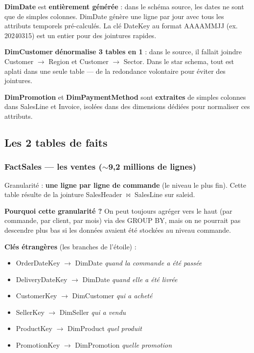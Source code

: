 \documentclass[11pt,a4paper]{article}
\renewcommand{\texttt}[1]{{\ttfamily\small\colorbox{codebg}{\textcolor{darktext}{#1}}}}
\begin{document}
\begin{infobox}
\textbf{DimDate} est \textbf{entièrement générée} : dans le schéma source, les dates ne sont que de simples colonnes. DimDate génère une ligne par jour avec tous les attributs temporels pré-calculés. La clé \texttt{DateKey} au format AAAAMMJJ (ex. 20240315) est un entier pour des jointures rapides.

\textbf{DimCustomer} \textbf{dénormalise 3 tables en 1} : dans le source, il fallait joindre Customer $\to$ Region et Customer $\to$ Sector. Dans le star schema, tout est aplati dans une seule table --- de la redondance volontaire pour éviter des jointures.

\textbf{DimPromotion} et \textbf{DimPaymentMethod} sont \textbf{extraites} de simples colonnes dans SalesLine et Invoice, isolées dans des dimensions dédiées pour normaliser ces attributs.
\end{infobox}

\subsection{Les 2 tables de faits}

\subsubsection{FactSales --- les ventes ($\sim$9,2 millions de lignes)}

Granularité : \textbf{une ligne par ligne de commande} (le niveau le plus fin). Cette table résulte de la jointure SalesHeader $\bowtie$ SalesLine sur \texttt{saleid}.

\textbf{Pourquoi cette granularité ?} On peut toujours agréger vers le haut (par commande, par client, par mois) via des \texttt{GROUP BY}, mais on ne pourrait pas descendre plus bas si les données avaient été stockées au niveau commande.

\textbf{Clés étrangères} (les branches de l'étoile) :
\begin{itemize}[noitemsep,leftmargin=1.2em]
  \item \texttt{OrderDateKey} $\to$ DimDate \hfill\textit{quand la commande a été passée}
  \item \texttt{DeliveryDateKey} $\to$ DimDate \hfill\textit{quand elle a été livrée}
  \item \texttt{CustomerKey} $\to$ DimCustomer \hfill\textit{qui a acheté}
  \item \texttt{SellerKey} $\to$ DimSeller \hfill\textit{qui a vendu}
  \item \texttt{ProductKey} $\to$ DimProduct \hfill\textit{quel produit}
  \item \texttt{PromotionKey} $\to$ DimPromotion \hfill\textit{quelle promotion}
\end{itemize}
\end{document}
